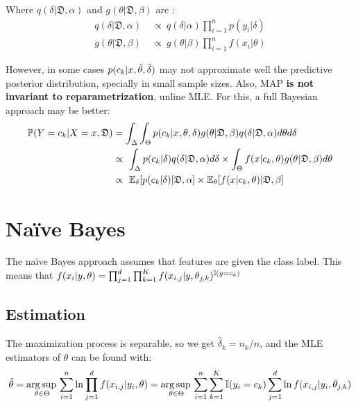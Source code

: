 Where $q(\delta|\mathfrak{D},\alpha)$ and $g(\theta|\mathfrak{D},\beta)$ are :
\begin{align*}
    q(\delta|\mathfrak{D},\alpha)\ & \propto\ q(\delta|\alpha)\prod_{i=1}^n p(y_i|\delta)\\    g(\theta|\mathfrak{D},\beta)\ & \propto\  g(\theta|\beta)\prod_{i=1}^n f(x_i|\theta)
\end{align*}

However, in some cases $p(c_k|x,\Tilde{\theta},\Tilde{\delta}) $ may not approximate well the predictive posterior distribution, specially in small sample sizes. Also, MAP \textbf{is not invariant to reparametrization}, unline MLE. For this, a full Bayesian approach may be better:
\begin{align*}
    \operatorname{\mathbb{P}}(Y=c_k|X=x,\mathfrak{D}) &=\int_{\Delta}\int_{\Theta}p(c_k|x,\theta,\delta)g(\theta|\mathfrak{D},\beta)q(\delta|\mathfrak{D},\alpha)d\theta d\delta \\
    &\propto\ \int_{\Delta} p(c_k|\delta)q(\delta|\mathfrak{D},\alpha) d\delta\times \int_{\Theta}f(x|c_k,\theta) g(\theta|\mathfrak{D},\beta) d\theta\\
    &\propto\ \operatorname{\mathbb{E}}_{\delta}[p(c_k|\delta)|\mathfrak{D},\alpha]\times \operatorname{\mathbb{E}}_{\theta}[f(x|c_k,\theta)|\mathfrak{D},\beta]
\end{align*}





\section{Naïve Bayes}
The naïve Bayes approach assumes that features are  given the class label. This means that $f(x_i|y,\theta)=\prod_{j=1}^d\prod_{k=1}^K  f(x_{i,j}|y,\theta_{j,k})^{\operatorname{\mathbb{I}}(y=c_k)}$

\subsection{Estimation}

The maximization process is separable, so we get $\hat{\delta}_{k}=n_k/n$, and the MLE estimators of $\theta$ can be found with:
\begin{equation*}
    \hat{\theta}  = \operatorname*{arg\,sup\,}_{\theta\in\Theta} \sum_{i=1}^n\ln\prod_{j=1}^d f(x_{i,j}|y_i,\theta) = \operatorname*{arg\,sup\,}_{\theta\in\Theta} \sum_{i=1}^n\sum_{k=1}^K\operatorname{\mathbb{I}}(y_i=c_k)\sum_{j=1}^d\ln f(x_{i,j}|y_i,\theta_{j,k})
\end{equation*}

